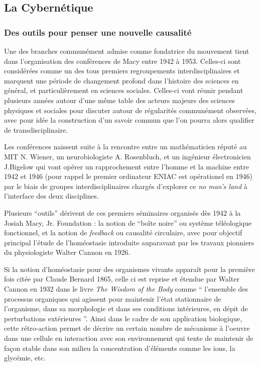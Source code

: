 \subsection{La Cybernétique}
\label{ssubsec:cybernetic}

\subsubsection{Des outils pour penser une nouvelle causalité}

Une des branches communément admise comme fondatrice du mouvement tient dans l'organisation des conférences de Macy entre 1942 à 1953. Celles-ci sont considérées comme un des tous premiers regroupements interdisciplinaires et marquent une période de changement profond dans l'histoire des sciences en général, et particulièrement en sciences sociales. Celles-ci vont réunir pendant plusieurs années autour d'une même table des acteurs majeurs des sciences physiques et sociales pour discuter autour de régularités communément observées, avec pour idée la construction d'un savoir commun que l'on pourra alors qualifier de transdisciplinaire.

Les conférences naissent suite à la rencontre entre un mathématicien réputé au MIT N. Wiener, un neurobiologiste A. Rosenbluch, et un ingénieur électronicien J.Bigelow qui vont opérer un rapprochement entre l'homme et la machine entre 1942 et 1946 (pour rappel le premier ordinateur ENIAC est opérationel en 1946) par le biais de groupes interdisciplinaires chargés d'explorer ce \textit{no man's land} à l'interface des deux disciplines.

Plusieurs \enquote{outils} dérivent de ces premiers séminaires organisés dès 1942 à la Josiah Macy, Jr. Foundation : la notion de \enquote{boîte noire} ou système téléologique fonctionnel, et la notion de \textit{feedback} ou causalité circulaire, avec pour objectif principal l'étude de l'homéostasie introduite auparavant par les travaux pionniers du physiologiste Walter Cannon en 1926.

Si la notion d'homéostasie pour des organismes vivants apparaît pour la première fois citée par Claude Bernard 1865, celle ci est reprise et étendue par Walter Cannon en 1932 dans le livre \textit{The Wisdom of the Body} \autocite{Cannon1932} comme \enquote{ l’ensemble des processus organiques qui agissent pour maintenir l’état stationnaire de l’organisme, dans sa morphologie et dans ses conditions intérieures, en dépit de perturbations extérieures }. Ainsi dans le cadre de son application biologique, cette rétro-action permet de décrire un certain nombre de mécanisme à l'oeuvre dans une cellule en interaction avec son environnement qui tente de maintenir de façon stable dans son milieu la concentration d'éléments comme les ions, la glycémie, etc.

